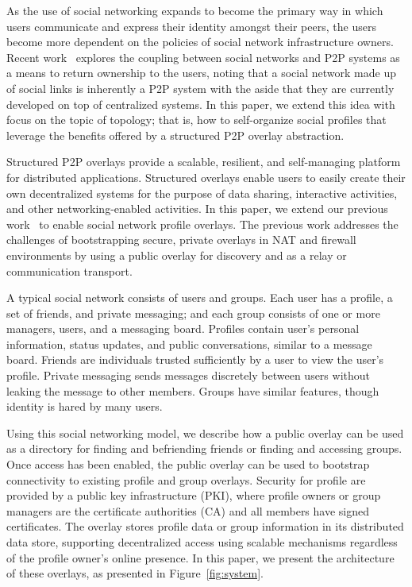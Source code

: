 \documentclass[conference]{IEEEtran}
\begin{document}
As the use of social networking expands to become the primary way in which
users communicate and express their identity amongst their peers, the users
become more dependent on the policies of social network infrastructure owners.
Recent work~\cite{p2p_socialnetwork} explores the coupling between social
networks and P2P systems as a means to return ownership to the users, noting
that a social network made up of social links is inherently a P2P system with
the aside that they are currently developed on top of centralized systems.  In
this paper, we extend this idea with focus on the topic of topology; that is,
how to self-organize social profiles that leverage the benefits offered by a
structured P2P overlay abstraction.

Structured P2P overlays provide a scalable, resilient, and self-managing
platform for distributed applications.  Structured overlays enable users to
easily create their own decentralized systems for the purpose of data sharing,
interactive activities, and other networking-enabled activities.  In this
paper, we extend our previous work~\cite{vpo} to enable social network profile
overlays.  The previous work addresses the challenges of bootstrapping secure,
private overlays in NAT and firewall environments by using a public overlay
for discovery and as a relay or communication transport.  

A typical social network consists of users and groups.  Each user has a
profile, a set of friends, and private messaging; and each group consists of
one or more managers, users, and a messaging board.  Profiles contain user's
personal information, status updates, and public conversations, similar to a
message board.  Friends are individuals trusted sufficiently by a user to view
the user's profile.  Private messaging sends messages discretely between users
without leaking the message to other members.  Groups have similar features,
though identity is hared by many users.

Using this social networking model, we describe how a public overlay can be
used as a directory for finding and befriending friends or finding and
accessing groups.  Once access has been enabled, the public overlay can be used
to bootstrap connectivity to existing profile and group overlays.  Security for
profile are provided by a public key infrastructure (PKI), where profile owners
or group managers are the certificate authorities (CA) and all members have
signed certificates.  The overlay stores profile data or group information in
its distributed data store, supporting decentralized access using scalable
mechanisms regardless of the profile owner's online presence.  In this paper,
we present the architecture of these overlays, as presented in
Figure~\ref{fig:system}.
\end{document}
